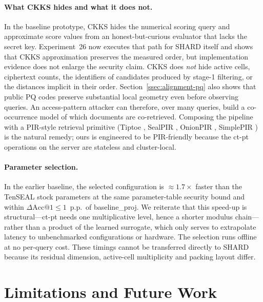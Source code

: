 \documentclass[11pt,a4paper]{article}
\begin{document}
\paragraph{What CKKS hides and what it does not.} In the baseline prototype,
CKKS hides the numerical scoring query and approximate score values from an
honest-but-curious evaluator that lacks the secret key. Experiment~26 now
executes that path for SHARD itself and shows that CKKS approximation preserves
the measured order, but implementation evidence does not enlarge the security
claim. CKKS does \emph{not} hide active cells, ciphertext counts, the
identifiers of candidates produced by stage-1 filtering, or the distances
implicit in their order. Section~\ref{ssec:alignment-pq} also shows that public PQ
codes preserve substantial local geometry even before observing queries.
An access-pattern attacker can therefore, over many queries, build a
co-occurrence model of which documents are co-retrieved.
Composing the pipeline with a PIR-style retrieval primitive (Tiptoe
\cite{ref_tiptoe}, SealPIR \cite{ref_sealpir}, OnionPIR
\cite{ref_onionpir}, SimplePIR \cite{ref_simplepir}) is the natural
remedy; ours is engineered to be PIR-friendly because the
ct-pt operations on the server are stateless and cluster-local.

\paragraph{Parameter selection.} In the earlier baseline, the selected configuration is
$\approx 1.7\times$ faster than the TenSEAL stock parameters at the same
parameter-table security bound and within $\Delta\mathrm{Acc@1}\leq 1$~p.p.\
of baseline\_proj. We reiterate that this speed-up is structural---ct-pt
needs one multiplicative level, hence a shorter modulus chain---rather than
a product of the learned surrogate, which only serves to extrapolate
latency to unbenchmarked configurations or hardware. The selection runs
offline at no per-query cost. These timings cannot be transferred directly
to SHARD because its residual dimension, active-cell multiplicity and packing
layout differ.

\section{Limitations and Future Work}\label{sec:limits}
\end{document}
